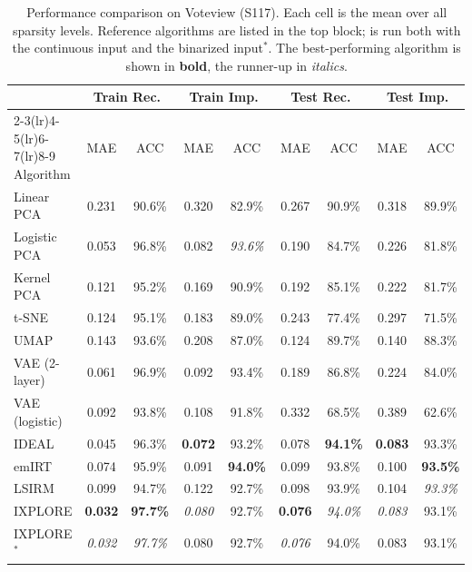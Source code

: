 \begin{table}[ht]
\centering
\caption{Performance comparison on Voteview (S117). Each cell is the mean over all sparsity levels. Reference algorithms are listed in the top block; \IXPLORE is run both with the continuous input and the binarized input$^*$. The best-performing algorithm is shown in \textbf{bold}, the runner-up in \textit{italics}.}
\label{tab:baseline_voteview}
\small
\begin{tabular}{lcccccccc}
\toprule
 & \multicolumn{2}{c}{Train Rec.} & \multicolumn{2}{c}{Train Imp.} & \multicolumn{2}{c}{Test Rec.} & \multicolumn{2}{c}{Test Imp.} \\
\cmidrule(lr){2-3}\cmidrule(lr){4-5}\cmidrule(lr){6-7}\cmidrule(lr){8-9}
Algorithm & MAE & ACC & MAE & ACC & MAE & ACC & MAE & ACC \\
\midrule
Linear PCA & 0.231 & 90.6\% & 0.320 & 82.9\% & 0.267 & 90.9\% & 0.318 & 89.9\% \\
Logistic PCA & 0.053 & 96.8\% & 0.082 & \textit{93.6\%} & 0.190 & 84.7\% & 0.226 & 81.8\% \\
Kernel PCA & 0.121 & 95.2\% & 0.169 & 90.9\% & 0.192 & 85.1\% & 0.222 & 81.7\% \\
t-SNE & 0.124 & 95.1\% & 0.183 & 89.0\% & 0.243 & 77.4\% & 0.297 & 71.5\% \\
UMAP & 0.143 & 93.6\% & 0.208 & 87.0\% & 0.124 & 89.7\% & 0.140 & 88.3\% \\
VAE (2-layer) & 0.061 & 96.9\% & 0.092 & 93.4\% & 0.189 & 86.8\% & 0.224 & 84.0\% \\
VAE (logistic) & 0.092 & 93.8\% & 0.108 & 91.8\% & 0.332 & 68.5\% & 0.389 & 62.6\% \\
IDEAL & 0.045 & 96.3\% & \textbf{0.072} & 93.2\% & 0.078 & \textbf{94.1\%} & \textbf{0.083} & 93.3\% \\
emIRT & 0.074 & 95.9\% & 0.091 & \textbf{94.0\%} & 0.099 & 93.8\% & 0.100 & \textbf{93.5\%} \\
LSIRM & 0.099 & 94.7\% & 0.122 & 92.7\% & 0.098 & 93.9\% & 0.104 & \textit{93.3\%} \\
\midrule
IXPLORE & \textbf{0.032} & \textbf{97.7\%} & \textit{0.080} & 92.7\% & \textbf{0.076} & \textit{94.0\%} & \textit{0.083} & 93.1\% \\
IXPLORE$^*$ & \textit{0.032} & \textit{97.7\%} & 0.080 & 92.7\% & \textit{0.076} & 94.0\% & 0.083 & 93.1\% \\
\bottomrule
\end{tabular}
\end{table}

